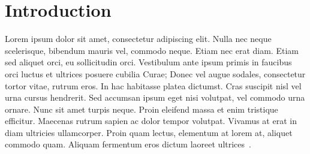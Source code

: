 \chapter{Introduction}\label{chap:introduction}

Lorem ipsum dolor sit amet, consectetur adipiscing elit. Nulla nec neque scelerisque, bibendum mauris vel, commodo neque. Etiam nec erat diam. Etiam sed aliquet orci, eu sollicitudin orci. Vestibulum ante ipsum primis in faucibus orci luctus et ultrices posuere cubilia Curae; Donec vel augue sodales, consectetur tortor vitae, rutrum eros. In hac habitasse platea dictumst. Cras suscipit nisl vel urna cursus hendrerit. Sed accumsan ipsum eget nisi volutpat, vel commodo urna ornare. Nunc sit amet turpis neque. Proin eleifend massa et enim tristique efficitur. Maecenas rutrum sapien ac dolor tempor volutpat. Vivamus at erat in diam ultricies ullamcorper. Proin quam lectus, elementum at lorem at, aliquet commodo quam. Aliquam fermentum eros dictum laoreet ultrices~\cite{smith2011lorem}. 